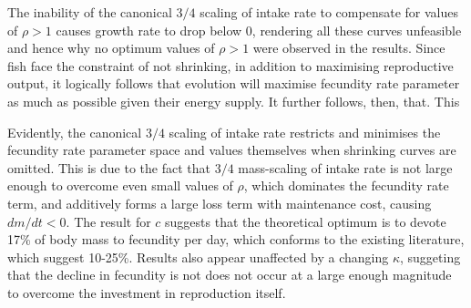 \documentclass[a4paper]{article} %
\begin{document}
The inability of the canonical $3/4$ scaling of intake rate to compensate for values of $\rho > 1$ causes growth rate to drop below 0, rendering all these curves unfeasible and hence why no optimum values of $\rho > 1$ were observed in the results. Since fish face the constraint of not shrinking, in addition to maximising reproductive output, it logically follows that evolution will maximise fecundity rate parameter as much as possible given their energy supply. It further follows, then, that. This 

Evidently, the canonical $3/4$ scaling of intake rate restricts and minimises the fecundity rate parameter space and values themselves when shrinking curves are omitted. This is due to the fact that $3/4$ mass-scaling of intake rate is not large enough to overcome even small values of $\rho$, which dominates the fecundity rate term, and additively forms a large loss term with maintenance cost, causing $dm/dt < 0$. The result for $c$ suggests that the theoretical optimum is to devote 17\% of body mass to fecundity per day, which conforms to the existing literature, which suggest 10-25\%. Results also appear unaffected by a changing $\kappa$, suggeting that the decline in fecundity is not does not occur at a large enough magnitude to overcome the investment in reproduction itself.
\end{document}
